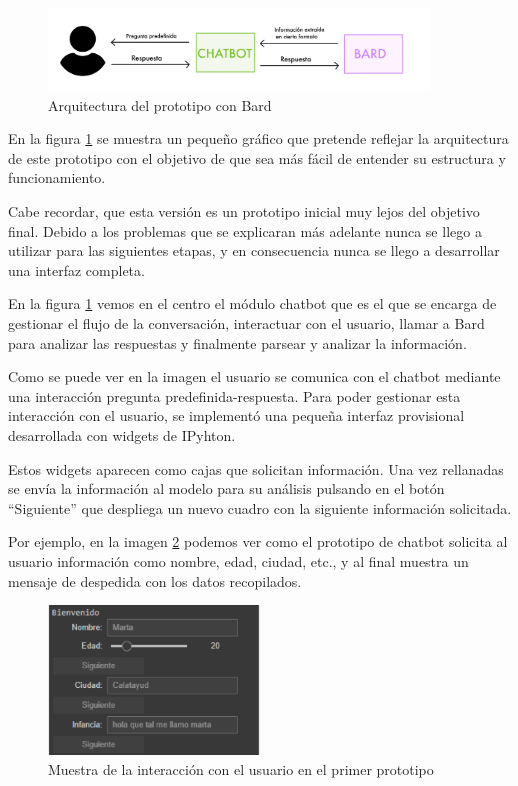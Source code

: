 \begin{figure}[b]
	\centering
	\includegraphics[width=0.9\textwidth]{Imagenes/arquitecturabard}
	\caption{Arquitectura del prototipo con Bard}
	\label{fig:arquitecturabard}
\end{figure}

En la figura \ref{fig:arquitecturabard} se muestra un pequeño gráfico que pretende reflejar la arquitectura de este prototipo con el objetivo  de que sea más fácil de entender su estructura y funcionamiento.

Cabe recordar, que esta versión es un prototipo inicial muy lejos del objetivo final. Debido a los problemas que se explicaran más adelante nunca se llego a utilizar para las siguientes etapas, y en consecuencia nunca se llego a desarrollar una interfaz completa. 

En la figura \ref{fig:arquitecturabard} vemos en el centro el módulo chatbot que es el que se encarga de gestionar el flujo de la conversación, interactuar con el usuario, llamar a Bard para analizar las respuestas y finalmente parsear y analizar la información. 

Como se puede ver en la imagen el usuario se comunica con el chatbot mediante una interacción pregunta predefinida-respuesta. Para poder gestionar esta interacción con el usuario, se implementó una pequeña interfaz provisional desarrollada con widgets de IPyhton. 

Estos widgets aparecen como cajas que solicitan información. Una vez rellanadas se envía la información al modelo para su análisis pulsando en el botón ``Siguiente'' que despliega un nuevo cuadro con la siguiente información solicitada. 

Por ejemplo, en la imagen \ref{fig:interfazPrototipo1} podemos ver como el prototipo de chatbot solicita al usuario información como nombre, edad, ciudad, etc., y al final muestra un mensaje de despedida con los datos recopilados. 
\begin{figure}[h]
	\centering
	\includegraphics[width=0.5\textwidth]{Imagenes/Iwidget}
	\caption{Muestra de la interacción  con el usuario en el primer prototipo}
	\label{fig:interfazPrototipo1}
\end{figure}

